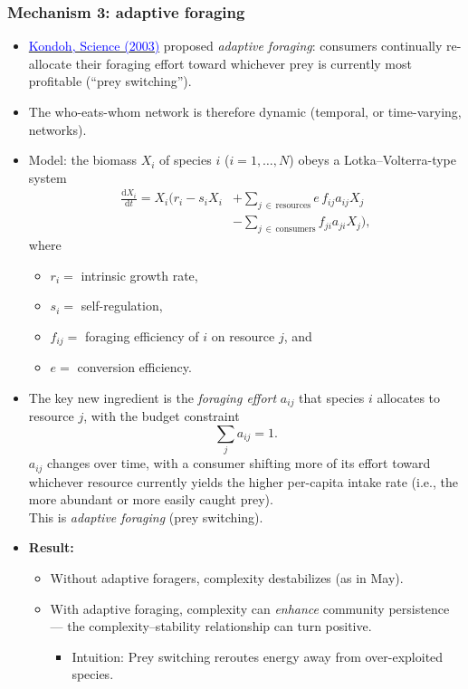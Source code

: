 \documentclass[20pt]{extarticle}
\newcommand{\hrefc}[2]{\href{#1}{\textcolor{blue}{#2}}}
\begin{document}
\subsubsection*{Mechanism 3: adaptive foraging}

\begin{itemize}
\item \hrefc{https://doi.org/10.1126/science.1079154}{Kondoh, Science (2003)} proposed \emph{adaptive foraging}: consumers continually re-allocate their foraging effort toward whichever prey is currently most profitable (``prey switching''). 
\item The who-eats-whom network is therefore dynamic (temporal, or time-varying, networks).
\item Model: the biomass $X_i$ of species $i$ ($i = 1,\ldots,N$) obeys a Lotka--Volterra-type system
\[
\begin{aligned}
\frac{\text{d}X_i}{\text{d}t} = X_i\Bigg( r_i - s_i X_i
&+ \sum_{j\,\in\,\text{resources}} e\, f_{ij} a_{ij} X_j\\
&- \sum_{j\,\in\,\text{consumers}} f_{ji} a_{ji} X_j \Bigg),
\end{aligned}
\]
where
	\begin{itemize}
	\item $r_i =$ intrinsic growth rate,
	\item $s_i =$ self-regulation,
	\item $f_{ij} =$ foraging efficiency of $i$ on resource $j$, and
	\item $e =$ conversion efficiency.
	\end{itemize}
\item The key new ingredient is the \emph{foraging effort} $a_{ij}$ that species $i$ allocates to resource $j$, with the budget constraint
\[ \sum_{j} a_{ij} = 1. \]
$a_{ij}$ changes over time, with a consumer shifting more of its effort toward whichever resource currently yields the higher per-capita intake rate (i.e., the more abundant or more easily caught prey).\\
This is \emph{adaptive foraging} (prey switching).
\item \textbf{Result:} 
	\begin{itemize}
	\item Without adaptive foragers, complexity destabilizes (as in May).
	\item With adaptive foraging, complexity can \emph{enhance} community persistence --- the complexity--stability relationship can turn positive.
		\begin{itemize}
		\item Intuition: Prey switching reroutes energy away from over-exploited species.
		\end{itemize}
	\end{itemize}
\end{itemize}
\end{document}
